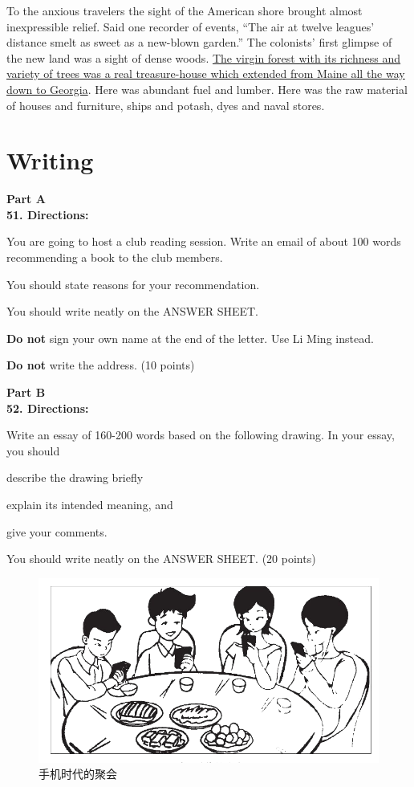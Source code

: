 To the anxious travelers the sight of the American shore brought almost
inexpressible relief. Said one recorder of events, ``The air at twelve
leagues' distance smelt as sweet as a new-blown garden.'' The colonists'
first glimpse of the new land was a sight of dense woods.
\transnum \uline{The virgin forest with its richness and variety of trees
	was a real treasure-house which extended from Maine all the way down to
	Georgia}. Here was abundant fuel and lumber. Here was the raw material
of houses and furniture, ships and potash, dyes and naval stores.



\newpage

\section{Writing}


\noindent
\textbf{Part A}\\
\textbf{51. Directions:}

You are going to host a club reading session. Write an email of about
100 words recommending a book to the club members.

You should state reasons for your recommendation.

You should write neatly on the ANSWER SHEET.

\textbf{Do not} sign your own name at the end of the letter. Use Li Ming
instead.

\textbf{Do not} write the address. (10 points)


\vspace{2em}

\noindent
\textbf{Part B}\\
\textbf{52. Directions:}

Write an essay of 160-200 words based on the following drawing. In your
essay, you should
\begin{listwrite}
	\item
 describe the drawing briefly
\item 
 explain its intended meaning, and
\item 
 give your comments.
	
\end{listwrite}

You should write neatly on the ANSWER SHEET. (20 points)

\begin{figure}[h!]
	\centering
	\includegraphics[width=0.58\linewidth]{picture/2015.png}
	\caption*{手机时代的聚会}
\end{figure}

\checkpagenumber